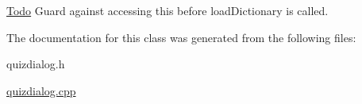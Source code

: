 \begin{Desc}
\item[\hyperlink{todo__todo000004}{Todo}]Guard against accessing this before loadDictionary is called. \end{Desc}




The documentation for this class was generated from the following files:\begin{DoxyCompactItemize}
\item 
quizdialog.h\item 
\hyperlink{quizdialog_8cpp}{quizdialog.cpp}\end{DoxyCompactItemize}
